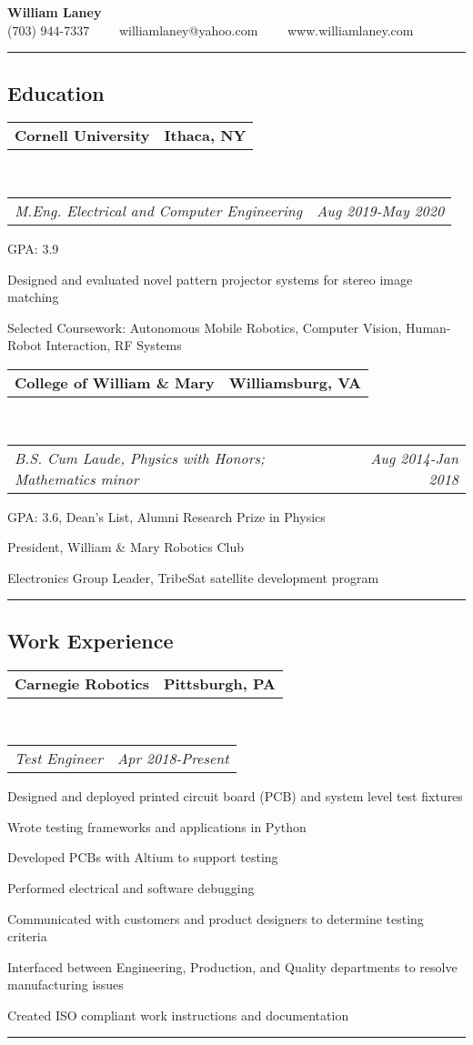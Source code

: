 \documentclass[10pt,letterpaper]{article}
\makeatletter
\newcommand{\headerrow}[2]
{\begin{tabular*}{\linewidth}{l@{\extracolsep{\fill}}r}
	#1 &
	#2 \\
\end{tabular*}}
\makeatother
\begin{document}
\begin{center}
{\LARGE \textbf{William Laney}}\\
\vspace{0.1em}
(703) 944-7337\ \ \textbullet
\ \ williamlaney@yahoo.com\ \ \textbullet
\ \ www.williamlaney.com
\end{center}

\hrule
\vspace{-0.4em}
\subsection*{Education}
	\headerrow
		{\textbf{Cornell University}}
		{\textbf{Ithaca, NY}}
		\\
	\headerrow
		{\emph{M.Eng. Electrical and Computer Engineering}}
		{\emph{Aug 2019-May 2020}}
	\begin{itemize*}
		\item GPA: 3.9
		\item Designed and evaluated novel pattern projector systems for stereo image matching
		\item Selected Coursework: Autonomous Mobile Robotics, Computer Vision, Human-Robot Interaction, RF Systems
	\end{itemize*}
	\headerrow
		{\textbf{College of William \& Mary}}
		{\textbf{Williamsburg, VA}}
	\\
	\headerrow
		{\emph{B.S. Cum Laude, Physics with Honors; Mathematics minor}}
		{\emph{Aug 2014-Jan 2018}}
	\begin{itemize*}
		\item GPA: 3.6, Dean's List, Alumni Research Prize in Physics
		\item President, William \& Mary Robotics Club
		\item Electronics Group Leader, TribeSat satellite development program
	\end{itemize*}


\hrule
\vspace{-0.4em}
\subsection*{Work Experience}
\headerrow
		{\textbf{Carnegie Robotics}}
		{\textbf{Pittsburgh, PA}}
	\\
	\headerrow
		{\emph{Test Engineer}}
		{\emph{Apr 2018-Present}}
	\begin{itemize*}
		\item Designed and deployed printed circuit board (PCB) and system level test fixtures
		\item Wrote testing frameworks and applications in Python		
		\item Developed PCBs with Altium to support testing
		\item Performed electrical and software debugging
		\item Communicated with customers and product designers to determine testing criteria
		\item Interfaced between Engineering, Production, and Quality departments to resolve manufacturing issues
		\item Created ISO compliant work instructions and documentation
	\end{itemize*}
\hrule
\vspace{-0.4em}
\end{document}

